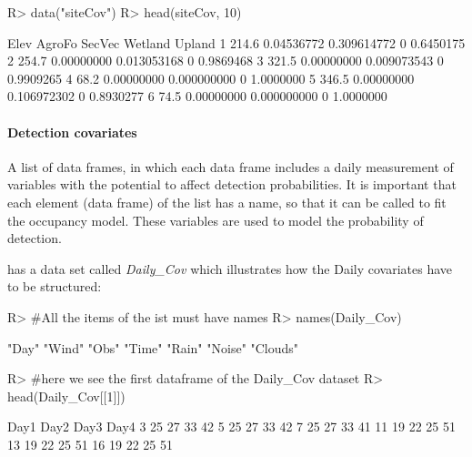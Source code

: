 \documentclass[article]{jss}
\begin{document}
\begin{CodeChunk}

\begin{CodeInput}
R> data("siteCov")
R> head(siteCov, 10)
\end{CodeInput}
\end{CodeChunk}

\begin{CodeChunk}

\begin{CodeOutput}
   Elev     AgroFo      SecVec Wetland    Upland
1 214.6 0.04536772 0.309614772       0 0.6450175
2 254.7 0.00000000 0.013053168       0 0.9869468
3 321.5 0.00000000 0.009073543       0 0.9909265
4  68.2 0.00000000 0.000000000       0 1.0000000
5 346.5 0.00000000 0.106972302       0 0.8930277
6  74.5 0.00000000 0.000000000       0 1.0000000
\end{CodeOutput}
\end{CodeChunk}

\paragraph{Detection covariates}\label{detection-covariates}

A list of data frames, in which each data frame includes a daily
measurement of variables with the potential to affect detection
probabilities. It is important that each element (data frame) of the
list has a name, so that it can be called to fit the occupancy model.
These variables are used to model the probability of detection.

 has a data set called \emph{Daily\_Cov} which
illustrates how the Daily covariates have to be structured:

\begin{CodeChunk}

\begin{CodeInput}
R> #All the items of the ist must have names
R> names(Daily_Cov)
\end{CodeInput}

\begin{CodeOutput}
[1] "Day"    "Wind"   "Obs"    "Time"   "Rain"   "Noise"  "Clouds"
\end{CodeOutput}

\begin{CodeInput}
R> #here we see the first dataframe of the Daily_Cov dataset
R> head(Daily_Cov[[1]])
\end{CodeInput}

\begin{CodeOutput}
   Day1 Day2 Day3 Day4
3    25   27   33   42
5    25   27   33   42
7    25   27   33   41
11   19   22   25   51
13   19   22   25   51
16   19   22   25   51
\end{CodeOutput}
\end{CodeChunk}
\end{document}
